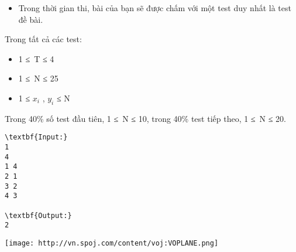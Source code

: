 \begin{itemize}
	\item Trong thời gian thi, bài của bạn sẽ được chấm với một test duy nhất là test đề bài.
\end{itemize}
Trong tất cả các test:
\begin{itemize}
	\item 1 ≤ T ≤ 4
	\item 1 ≤ N ≤ 25
	\item 1 ≤ $x_{i}$ , $y_{i}$ ≤ N
\end{itemize}

Trong 40\% số test đầu tiên, 1 ≤ N ≤ 10, trong 40\% test tiếp theo, 1 ≤ N ≤ 20.
\begin{verbatim}
\textbf{Input:}
1
4
1 4
2 1
3 2
4 3

\textbf{Output:}
2
\end{verbatim}
\texttt{[image: http://vn.spoj.com/content/voj:VOPLANE.png]}